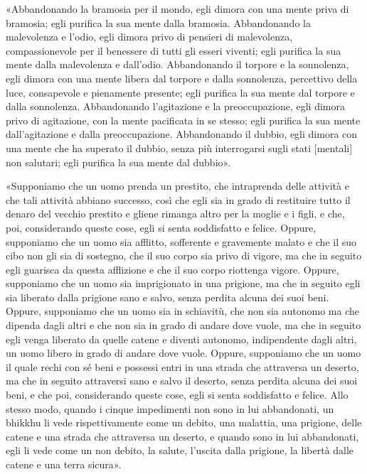 «Abbandonando la bramosia per il mondo, egli dimora con una mente priva di
bramosia; egli purifica la sua mente dalla bramosia. Abbandonando la malevolenza
e l’odio, egli dimora privo di pensieri di malevolenza, compassionevole per il
benessere di tutti gli esseri viventi; egli purifica la sua mente dalla
malevolenza e dall’odio. Abbandonando il torpore e la sonnolenza, egli dimora
con una mente libera dal torpore e dalla sonnolenza, percettivo della luce,
consapevole e pienamente presente; egli purifica la sua mente dal torpore e
dalla sonnolenza. Abbandonando l’agitazione e la preoccupazione, egli dimora
privo di agitazione, con la mente pacificata in se stesso; egli purifica la sua
mente dall’agitazione e dalla preoccupazione. Abbandonando il dubbio, egli
dimora con una mente che ha superato il dubbio, senza più interrogarsi sugli
stati [mentali] non salutari; egli purifica la sua mente dal dubbio».


«Supponiamo che un uomo prenda un prestito, che intraprenda delle attività e che
tali attività abbiano successo, così che egli sia in grado di restituire tutto
il denaro del vecchio prestito e gliene rimanga altro per la moglie e i figli, e
che, poi, considerando queste cose, egli si senta soddisfatto e felice. Oppure,
supponiamo che un uomo sia afflitto, sofferente e gravemente malato e che il suo
cibo non gli sia di sostegno, che il suo corpo sia privo di vigore, ma che in
seguito egli guarisca da questa afflizione e che il suo corpo riottenga vigore.
Oppure, supponiamo che un uomo sia imprigionato in una prigione, ma che in
seguito egli sia liberato dalla prigione sano e salvo, senza perdita alcuna dei
suoi beni. Oppure, supponiamo che un uomo sia in schiavitù, che non sia autonomo
ma che dipenda dagli altri e che non sia in grado di andare dove vuole, ma che
in seguito egli venga liberato da quelle catene e diventi autonomo, indipendente
dagli altri, un uomo libero in grado di andare dove vuole. Oppure, supponiamo
che un uomo il quale rechi con sé beni e possessi entri in una strada che
attraversa un deserto, ma che in seguito attraversi sano e salvo il deserto,
senza perdita alcuna dei suoi beni, e che poi, considerando queste cose, egli si
senta soddisfatto e felice. Allo stesso modo, quando i cinque impedimenti non
sono in lui abbandonati, un bhikkhu li vede rispettivamente come un debito, una
malattia, una prigione, delle catene e una strada che attraversa un deserto, e
quando sono in lui abbandonati, egli li vede come un non debito, la salute,
l’uscita dalla prigione, la libertà dalle catene e una terra sicura».

